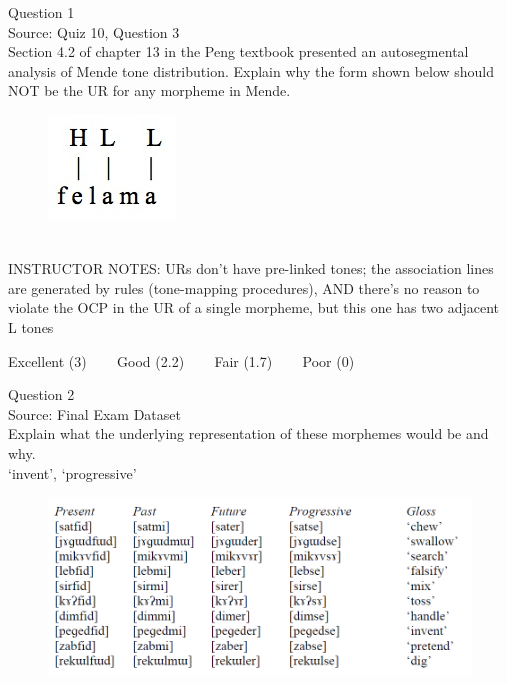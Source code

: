 \documentclass[12pt]{article}
\begin{document}
\begin{center}
\textbf{{\color{blue}{\HUGE START OF EXAM\\}}}

\textbf{{\color{blue}{\HUGE Student ID: 3347\\}}}

\textbf{{\color{blue}{\HUGE 5:00 - 5:20 PM\\}}}

\end{center}
\newpage

{\large Question 1}\\

Source: Quiz 10, Question 3\\

Section 4.2 of chapter 13 in the Peng textbook presented an autosegmental analysis of Mende tone distribution. Explain why the form shown below should NOT be the UR for any morpheme in Mende.\\

\begin{figure}[H]
\includegraphics{../images/mende_junction_c.png}
\end{figure}

~\\
INSTRUCTOR NOTES: URs don't have pre-linked tones; the association lines are generated by rules (tone-mapping procedures), AND there's no reason to violate the OCP in the UR of a single morpheme, but this one has two adjacent L tones


\vfill
Excellent (3) ~~~ Good (2.2) ~~~ Fair (1.7) ~~~ Poor (0)
\newpage

{\large Question 2}\\

Source: Final Exam Dataset\\

Explain what the underlying representation of these morphemes would be and why.\\

`invent', `progressive'

\begin{figure}[H]
\includegraphics{../images/final_dataset.png}
\end{figure}
\end{document}
